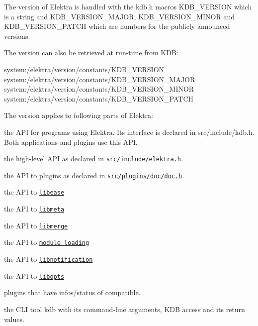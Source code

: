 The version of Elektra is handled with the kdb.\+h macros {\ttfamily K\+D\+B\+\_\+\+V\+E\+R\+S\+I\+ON} which is a string and {\ttfamily K\+D\+B\+\_\+\+V\+E\+R\+S\+I\+O\+N\+\_\+\+M\+A\+J\+OR}, {\ttfamily K\+D\+B\+\_\+\+V\+E\+R\+S\+I\+O\+N\+\_\+\+M\+I\+N\+OR} and {\ttfamily K\+D\+B\+\_\+\+V\+E\+R\+S\+I\+O\+N\+\_\+\+P\+A\+T\+CH} which are numbers for the publicly announced versions.

The version can also be retrieved at run-\/time from K\+DB\+:


\begin{DoxyCode}
system:/elektra/version/constants/KDB\_VERSION
system:/elektra/version/constants/KDB\_VERSION\_MAJOR
system:/elektra/version/constants/KDB\_VERSION\_MINOR
system:/elektra/version/constants/KDB\_VERSION\_PATCH
\end{DoxyCode}


The version applies to following parts of Elektra\+:


\begin{DoxyItemize}
\item the A\+PI for programs using Elektra. Its interface is declared in src/include/kdb.h. Both applications and plugins use this A\+PI.
\item the high-\/level A\+PI as declared in \href{/home/jenkins/workspace/libelektra-release/src/include/elektra.h}{\tt src/include/elektra.\+h}.
\item the A\+PI to plugins as declared in \href{/home/jenkins/workspace/libelektra-release/src/plugins/doc/doc.h}{\tt src/plugins/doc/doc.\+h}.
\item the A\+PI to \href{/home/jenkins/workspace/libelektra-release/src/include/kdbease.h}{\tt libease}
\item the A\+PI to \href{/home/jenkins/workspace/libelektra-release/src/include/kdbmeta.h}{\tt libmeta}
\item the A\+PI to \href{/home/jenkins/workspace/libelektra-release/src/include/kdbmerge.h}{\tt libmerge}
\item the A\+PI to \href{/home/jenkins/workspace/libelektra-release/src/include/kdbmodule.h}{\tt module loading}
\item the A\+PI to \href{/home/jenkins/workspace/libelektra-release/src/include/kdbnotification.h}{\tt libnotification}
\item the A\+PI to \href{/home/jenkins/workspace/libelektra-release/src/include/kdbopts.h}{\tt libopts}
\item plugins that have {\ttfamily infos/status} of {\ttfamily compatible}.
\item the C\+LI tool {\ttfamily kdb} with its command-\/line arguments, K\+DB access and its return values.
\end{DoxyItemize}

